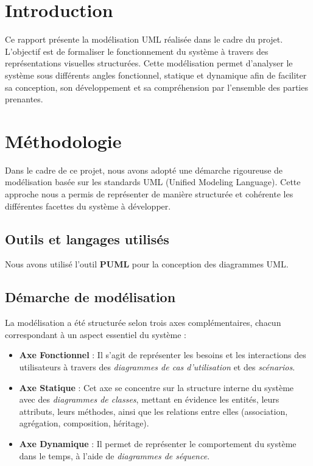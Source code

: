 \documentclass{article}
\begin{document}
\section{Introduction}

Ce rapport présente la modélisation UML réalisée dans le cadre du projet. L'objectif est de formaliser le fonctionnement du système à travers des représentations visuelles structurées. 
Cette modélisation permet d'analyser le système sous différents angles fonctionnel, statique et dynamique afin de faciliter sa conception, son développement et sa compréhension par l’ensemble des parties prenantes.

\section{Méthodologie}

Dans le cadre de ce projet, nous avons adopté une démarche rigoureuse de modélisation basée sur les standards UML (Unified Modeling Language). Cette approche nous a permis de représenter de manière structurée et cohérente les différentes facettes du système à développer.

\subsection*{Outils et langages utilisés}
Nous avons utilisé l’outil \textbf{PUML} pour la conception des diagrammes UML.

\subsection*{Démarche de modélisation}
La modélisation a été structurée selon trois axes complémentaires, chacun correspondant à un aspect essentiel du système :

\begin{itemize}
    \item \textbf{Axe Fonctionnel} : Il s'agit de représenter les besoins et les interactions des utilisateurs à travers des \textit{diagrammes de cas d’utilisation} et des \textit{scénarios}.
    
    \item \textbf{Axe Statique} : Cet axe se concentre sur la structure interne du système avec des \textit{diagrammes de classes}, mettant en évidence les entités, leurs attributs, leurs méthodes, ainsi que les relations entre elles (association, agrégation, composition, héritage).
    
    \item \textbf{Axe Dynamique} : Il permet de représenter le comportement du système dans le temps, à l’aide de \textit{diagrammes de séquence}.
\end{itemize}
\end{document}

